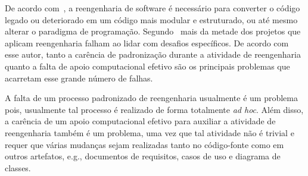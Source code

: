 De acordo com~\citet{chikofskyTax}, a reengenharia de software  é necessário para converter o código legado ou deteriorado em um código mais modular e estruturado, ou até mesmo alterar o paradigma de programação. 
Segundo~\citet{Sneed:2005} mais da metade dos projetos que aplicam reengenharia falham ao lidar com desafios específicos. De acordo com esse autor, tanto a carência de  padronização durante a atividade de reengenharia quanto a falta de apoio computacional efetivo são os principais problemas que acarretam esse grande número de falhas.  

A falta de um processo padronizado de reengenharia usualmente é um problema pois, usualmente tal processo é realizado de forma totalmente \textit{ad hoc}. Além disso, a carência de um apoio computacional efetivo para auxiliar a atividade de reengenharia também é um problema, uma vez que tal atividade não é trivial e requer que várias mudanças sejam realizadas tanto no código-fonte como em outros artefatos, e.g., documentos de requisitos, casos de uso e diagrama de classes. 


